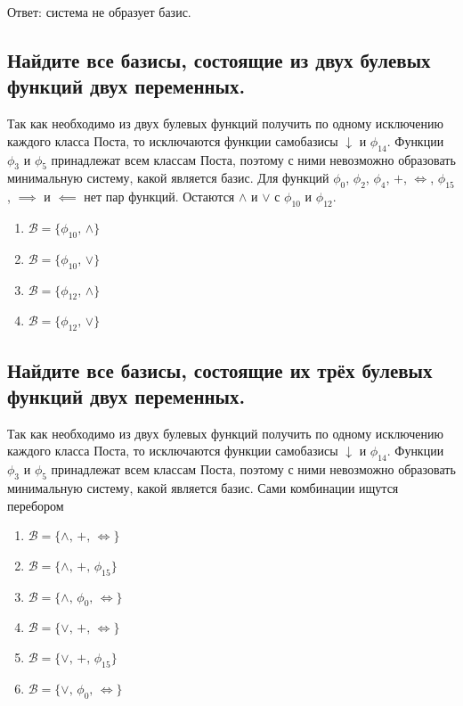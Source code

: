 \documentclass[12pt,a4paper]{article}
\theoremstyle{plain}
\theoremstyle{definition}
\theoremstyle{remark}
\numberwithin{equation}{section}
\begin{document}
\vspace{0.5em}
\noindent Ответ: система не образует базис.

\subsection{Найдите все базисы, состоящие из двух булевых функций двух переменных.}

Так как необходимо из двух булевых функций получить по одному исключению каждого 
класса Поста, то исключаются функции самобазисы $\downarrow$ и $\phi_{14}$. Функции
$\phi_3$ и $\phi_5$ принадлежат всем классам Поста, поэтому с ними невозможно
образовать минимальную систему, какой является базис. Для функций $\phi_0$, 
$\phi_2$, $\phi_4$, $+$, $\iff$, $\phi_{15}$, $\implies$ и $\impliedby$ нет пар 
функций. Остаются $\land$ и $\lor$ с $\phi_{10}$ и $\phi_{12}$.  
\begin{enumerate}
  \item $\mathcal{B} = \{\phi_{10},\,\land\}$
  \item $\mathcal{B} = \{\phi_{10},\,\lor\}$
  \item $\mathcal{B} = \{\phi_{12},\,\land\}$
  \item $\mathcal{B} = \{\phi_{12},\,\lor\}$
\end{enumerate}  

\subsection{Найдите все базисы, состоящие их трёх булевых функций двух переменных.}

Так как необходимо из двух булевых функций получить по одному исключению каждого 
класса Поста, то исключаются функции самобазисы $\downarrow$ и $\phi_{14}$. Функции
$\phi_3$ и $\phi_5$ принадлежат всем классам Поста, поэтому с ними невозможно
образовать минимальную систему, какой является базис. Сами комбинации ищутся перебором
\begin{enumerate}
  \item $\mathcal{B} = \{\land,\,+,\,\iff\}$
  \item $\mathcal{B} = \{\land,\,+,\,\phi_{15}\}$
  \item $\mathcal{B} = \{\land,\,\phi_0,\,\iff\}$
  \item $\mathcal{B} = \{\lor,\,+,\,\iff\}$
  \item $\mathcal{B} = \{\lor,\,+,\,\phi_{15}\}$
  \item $\mathcal{B} = \{\lor,\,\phi_0,\,\iff\}$
\end{enumerate}
\end{document}

